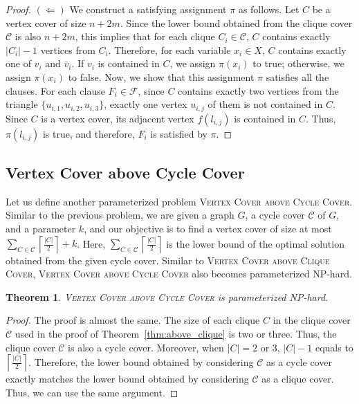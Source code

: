 \documentclass[11pt]{article}
\newtheorem{theorem}{Theorem}
\begin{document}
\begin{proof}
$(\Leftarrow)$
We construct a satisfying assignment $\pi$ as follows.
Let $C$ be a vertex cover of size $n+2m$.
Since the lower bound obtained from the clique cover $\mathcal{C}$ is also $n+2m$, this implies that for each clique
$C_i\in\mathcal{C}$, $C$ contains exactly $|C_i|-1$ vertices from $C_i$.
Therefore, for each variable $x_i\in X$, $C$ contains exactly one of $v_i$ and $\bar{v}_i$.
If $v_i$ is contained in $C$, we assign $\pi(x_i)$ to true; otherwise, we assign $\pi(x_i)$ to false.
Now, we show that this assignment $\pi$ satisfies all the clauses.
For each clause $F_i\in\mathcal{F}$, since $C$ contains exactly two vertices from the triangle
$\{u_{i,1},u_{i,2},u_{i,3}\}$, exactly one vertex $u_{i,j}$ of them is not contained in $C$.
Since $C$ is a vertex cover, its adjacent vertex $f(l_{i,j})$ is contained in $C$.
Thus, $\pi(l_{i,j})$ is true, and therefore, $F_i$ is satisfied by $\pi$.
\end{proof}

\subsection{Vertex Cover above Cycle Cover}

Let us define another parameterized problem \textsc{Vertex Cover above Cycle Cover}.
Similar to the previous problem, we are given a graph $G$, a cycle cover $\mathcal{C}$ of $G$,
and a parameter $k$, and our objective is to find a vertex cover of size at most
$\sum_{C\in\mathcal{C}}\left\lceil\frac{|C|}{2}\right\rceil+k$.
Here, $\sum_{C\in\mathcal{C}}\left\lceil\frac{|C|}{2}\right\rceil$ is the lower bound of the optimal solution obtained
from the given cycle cover.
Similar to \textsc{Vertex Cover above Clique Cover}, \textsc{Vertex Cover above Cycle Cover} also becomes parameterized
NP-hard.

\begin{theorem}\label{thm:above_cycle}
\textsc{Vertex Cover above Cycle Cover} is parameterized NP-hard.
\end{theorem}

\begin{proof}
The proof is almost the same.
The size of each clique $C$ in the clique cover $\mathcal{C}$ used in the proof of Theorem~\ref{thm:above_clique} is two
or three.
Thus, the clique cover $\mathcal{C}$ is also a cycle cover.
Moreover, when $|C|=2$ or $3$, $|C|-1$ equals to $\left\lceil\frac{|C|}{2}\right\rceil$.
Therefore, the lower bound obtained by considering $\mathcal{C}$ as a cycle cover exactly matches the lower bound
obtained by considering $\mathcal{C}$ as a clique cover.
Thus, we can use the same argument.
\end{proof}
 
\end{document}
